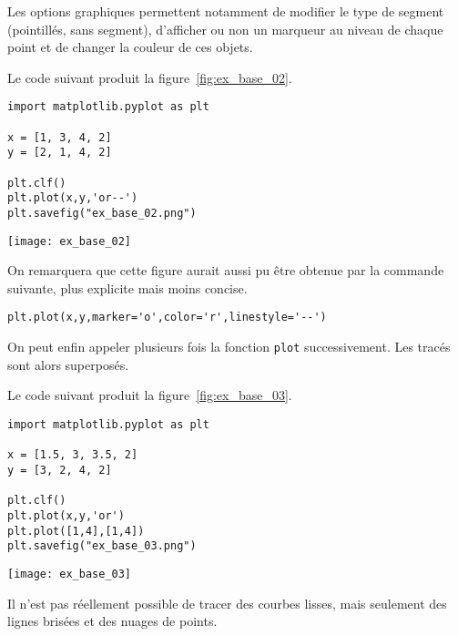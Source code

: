 Les options graphiques permettent notamment de modifier le type de segment (pointillés, sans segment), d'afficher ou non un marqueur au niveau de chaque point et de changer la couleur de ces objets. 
\begin{exemple}
  Le code suivant produit la figure~\ref{fig:ex_base_02}.
\begin{lstlisting}
import matplotlib.pyplot as plt

x = [1, 3, 4, 2]
y = [2, 1, 4, 2]

plt.clf()
plt.plot(x,y,'or--')
plt.savefig("ex_base_02.png")
\end{lstlisting}
  \begin{center}
    \texttt{[image: ex\_base\_02]}
    \label{fig:ex_base_02}
  \end{center}
On remarquera que cette figure aurait aussi pu être obtenue par la commande suivante, plus explicite mais moins concise. 
\begin{lstlisting}
plt.plot(x,y,marker='o',color='r',linestyle='--')
\end{lstlisting}
\end{exemple}

On peut enfin appeler plusieurs fois la fonction \texttt{plot} successivement. Les tracés sont alors superposés. 
\begin{exemple}
  Le code suivant produit la figure~\ref{fig:ex_base_03}.
\begin{lstlisting}
import matplotlib.pyplot as plt

x = [1.5, 3, 3.5, 2]
y = [3, 2, 4, 2]

plt.clf()
plt.plot(x,y,'or')
plt.plot([1,4],[1,4])
plt.savefig("ex_base_03.png")
\end{lstlisting}
  \begin{center}
    \texttt{[image: ex\_base\_03]}
    \label{fig:ex_base_03}
  \end{center}
\end{exemple}
\begin{rem}
  Il n'est pas réellement possible de tracer des courbes lisses, mais seulement des lignes brisées et des nuages de 
points. 
\end{rem}



